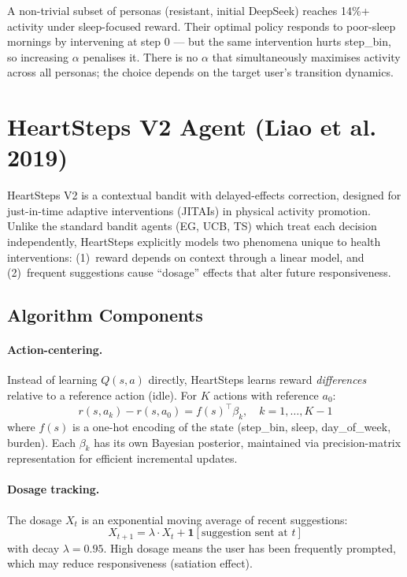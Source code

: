 \documentclass[11pt]{article}
\begin{document}
A non-trivial subset of personas (resistant, initial DeepSeek) reaches 14\%+ activity under sleep-focused reward. Their optimal policy responds to poor-sleep mornings by intervening at step 0 — but the same intervention hurts step\_bin, so increasing $\alpha$ penalises it. There is no $\alpha$ that simultaneously maximises activity across all personas; the choice depends on the target user's transition dynamics.

\section{HeartSteps V2 Agent (Liao et al. 2019)}

HeartSteps V2 is a contextual bandit with delayed-effects correction, designed for just-in-time adaptive interventions (JITAIs) in physical activity promotion. Unlike the standard bandit agents (EG, UCB, TS) which treat each decision independently, HeartSteps explicitly models two phenomena unique to health interventions: (1)~reward depends on context through a linear model, and (2)~frequent suggestions cause ``dosage'' effects that alter future responsiveness.

\subsection{Algorithm Components}

\paragraph{Action-centering.}
Instead of learning $Q(s, a)$ directly, HeartSteps learns reward \emph{differences} relative to a reference action (idle). For $K$ actions with reference $a_0$:
\[
r(s, a_k) - r(s, a_0) = f(s)^\top \beta_k, \quad k = 1, \dots, K-1
\]
where $f(s)$ is a one-hot encoding of the state (step\_bin, sleep, day\_of\_week, burden). Each $\beta_k$ has its own Bayesian posterior, maintained via precision-matrix representation for efficient incremental updates.

\paragraph{Dosage tracking.}
The dosage $X_t$ is an exponential moving average of recent suggestions:
\[
X_{t+1} = \lambda \cdot X_t + \mathbf{1}[\text{suggestion sent at } t]
\]
with decay $\lambda = 0.95$. High dosage means the user has been frequently prompted, which may reduce responsiveness (satiation effect).
\end{document}
